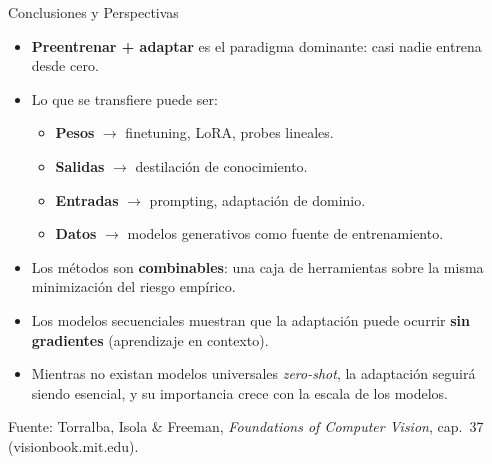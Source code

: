 \documentclass[aspectratio=169, 10pt]{beamer}
\begin{document}
\begin{frame}{Conclusiones y Perspectivas}

	\begin{itemize}
		\item \textbf{Preentrenar + adaptar} es el paradigma dominante: casi nadie entrena desde cero.

		\vspace{0.25cm}

		\item Lo que se transfiere puede ser:
		\begin{itemize}
			\item \textbf{Pesos} $\to$ finetuning, LoRA, probes lineales.
			\item \textbf{Salidas} $\to$ destilaci\'on de conocimiento.
			\item \textbf{Entradas} $\to$ prompting, adaptaci\'on de dominio.
			\item \textbf{Datos} $\to$ modelos generativos como fuente de entrenamiento.
		\end{itemize}

		\vspace{0.25cm}

		\item Los m\'etodos son \textbf{combinables}: una caja de herramientas sobre la misma minimizaci\'on del riesgo emp\'irico.

		\vspace{0.25cm}

		\item Los modelos secuenciales muestran que la adaptaci\'on puede ocurrir \textbf{sin gradientes} (aprendizaje en contexto).

		\vspace{0.25cm}

		\item Mientras no existan modelos universales \textit{zero-shot}, la adaptaci\'on seguir\'a siendo esencial, y su importancia crece con la escala de los modelos.
	\end{itemize}

	\vspace{0.2cm}

	{\scriptsize Fuente: Torralba, Isola \& Freeman, \textit{Foundations of Computer Vision}, cap.\ 37 (visionbook.mit.edu).}

\end{frame}
\end{document}

